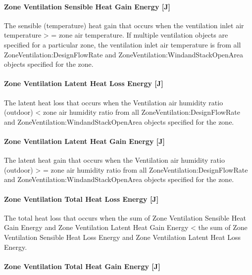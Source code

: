 \paragraph{Zone Ventilation Sensible Heat Gain Energy {[}J{]}}\label{zone-ventilation-sensible-heat-gain-energy-j}

The sensible (temperature) heat gain that occurs when the ventilation inlet air temperature \textgreater{} = zone air temperature. If multiple ventilation objects are specified for a particular zone, the ventilation inlet air temperature is from all ZoneVentilation:DesignFlowRate and ZoneVentilation:WindandStackOpenArea objects specified for the zone.

\paragraph{Zone Ventilation Latent Heat Loss Energy {[}J{]}}\label{zone-ventilation-latent-heat-loss-energy-j}

The latent heat loss that occurs when the Ventilation air humidity ratio (outdoor) \textless{} zone air humidity ratio from all ZoneVentilation:DesignFlowRate and ZoneVentilation:WindandStackOpenArea objects specified for the zone.

\paragraph{Zone Ventilation Latent Heat Gain Energy {[}J{]}}\label{zone-ventilation-latent-heat-gain-energy-j}

The latent heat gain that occurs when the Ventilation air humidity ratio (outdoor) \textgreater{} = zone air humidity ratio from all ZoneVentilation:DesignFlowRate and ZoneVentilation:WindandStackOpenArea objects specified for the zone.

\paragraph{Zone Ventilation Total Heat Loss Energy {[}J{]}}\label{zone-ventilation-total-heat-loss-energy-j}

The total heat loss that occurs when the sum of Zone Ventilation Sensible Heat Gain Energy and Zone Ventilation Latent Heat Gain Energy \textless{} the sum of Zone Ventilation Sensible Heat Loss Energy and Zone Ventilation Latent Heat Loss Energy.

\paragraph{Zone Ventilation Total Heat Gain Energy {[}J{]}}\label{zone-ventilation-total-heat-gain-energy-j}

